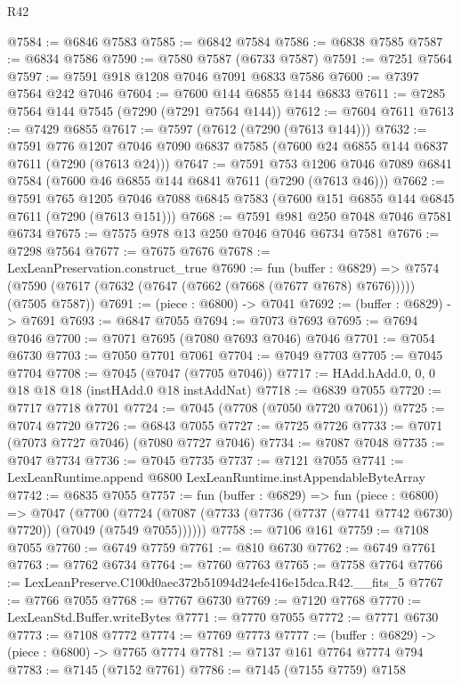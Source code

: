 \begin{lexlean}{R42}
\begin{coremodule}
{@7584 := @6846 @7583
@7585 := @6842 @7584
@7586 := @6838 @7585
@7587 := @6834 @7586
@7590 := @7580 @7587 (@6733 @7587)
@7591 := @7251 @7564
@7597 := @7591 @918 @1208 @7046 @7091 @6833 @7586
@7600 := @7397 @7564 @242 @7046
@7604 := @7600 @144 @6855 @144 @6833
@7611 := @7285 @7564 @144 @7545 (@7290 (@7291 @7564 @144))
@7612 := @7604 @7611
@7613 := @7429 @6855
@7617 := @7597 (@7612 (@7290 (@7613 @144)))
@7632 := @7591
    @776
    @1207
    @7046
    @7090
    @6837
    @7585
    (@7600 @24 @6855 @144 @6837 @7611 (@7290 (@7613 @24)))
@7647 := @7591
    @753
    @1206
    @7046
    @7089
    @6841
    @7584
    (@7600 @46 @6855 @144 @6841 @7611 (@7290 (@7613 @46)))
@7662 := @7591
    @765
    @1205
    @7046
    @7088
    @6845
    @7583
    (@7600 @151 @6855 @144 @6845 @7611 (@7290 (@7613 @151)))
@7668 := @7591 @981 @250 @7048 @7046 @7581 @6734
@7675 := @7575 @978 @13 @250 @7046 @7046 @6734 @7581
@7676 := @7298 @7564
@7677 := @7675 @7676
@7678 := LexLeanPreservation.construct_true
@7690 := fun (buffer : @6829) =>
  @7574 (@7590 (@7617 (@7632 (@7647 (@7662 (@7668 (@7677 @7678) @7676))))) (@7505 @7587))
@7691 := (piece : @6800) -> @7041
@7692 := (buffer : @6829) -> @7691
@7693 := @6847 @7055
@7694 := @7073 @7693
@7695 := @7694 @7046
@7700 := @7071 @7695 (@7080 @7693 @7046) @7046
@7701 := @7054 @6730
@7703 := @7050 @7701 @7061
@7704 := @7049 @7703
@7705 := @7045 @7704
@7708 := @7045 (@7047 (@7705 @7046))
@7717 := HAdd.hAdd.{0, 0, 0} @18 @18 @18 (instHAdd.{0} @18 instAddNat)
@7718 := @6839 @7055
@7720 := @7717 @7718 @7701
@7724 := @7045 (@7708 (@7050 @7720 @7061))
@7725 := @7074 @7720
@7726 := @6843 @7055
@7727 := @7725 @7726
@7733 := @7071 (@7073 @7727 @7046) (@7080 @7727 @7046)
@7734 := @7087 @7048
@7735 := @7047 @7734
@7736 := @7045 @7735
@7737 := @7121 @7055
@7741 := LexLeanRuntime.append @6800 LexLeanRuntime.instAppendableByteArray
@7742 := @6835 @7055
@7757 := fun (buffer : @6829) =>
  fun (piece : @6800) =>
  @7047
    (@7700 (@7724 (@7087 (@7733 (@7736 (@7737 (@7741 @7742 @6730) @7720)) (@7049 (@7549 @7055))))))
@7758 := @7106 @161
@7759 := @7108 @7055
@7760 := @6749 @7759
@7761 := @810 @6730
@7762 := @6749 @7761
@7763 := @7762 @6734
@7764 := @7760 @7763
@7765 := @7758 @7764
@7766 := LexLeanPreserve.C100d0aec372b51094d24efe416e15dca.R42.__fits_5
@7767 := @7766 @7055
@7768 := @7767 @6730
@7769 := @7120 @7768
@7770 := LexLeanStd.Buffer.writeBytes
@7771 := @7770 @7055
@7772 := @7771 @6730
@7773 := @7108 @7772
@7774 := @7769 @7773
@7777 := (buffer : @6829) -> (piece : @6800) -> @7765 @7774
@7781 := @7137 @161 @7764 @7774 @794
@7783 := @7145 (@7152 @7761)
@7786 := @7145 (@7155 @7759) @7158
}
\end{coremodule}
\end{lexlean}
